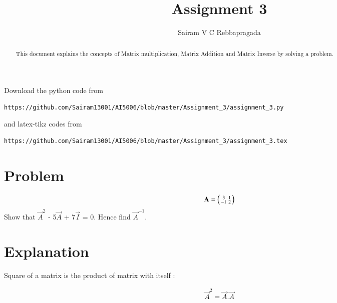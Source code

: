 \documentclass[journal,12pt,twocolumn]{IEEEtran}
\begin{document}
\renewcommand{\thefigure}{\theproblem}
\def\putbox#1#2#3{\makebox[0in][l]{\makebox[#1][l]{}\raisebox{\baselineskip}[0in][0in]{\raisebox{#2}[0in][0in]{#3}}}}
     \def\rightbox#1{\makebox[0in][r]{#1}}
     \def\centbox#1{\makebox[0in]{#1}}
     \def\topbox#1{\raisebox{-\baselineskip}[0in][0in]{#1}}
     \def\midbox#1{\raisebox{-0.5\baselineskip}[0in][0in]{#1}}
\vspace{3cm}
\title{Assignment 3}
\author{Sairam V C Rebbapragada}
\maketitle
\newpage
\bigskip
\renewcommand{\thefigure}{\theenumi}
\renewcommand{\thetable}{\theenumi}
\begin{abstract}
This document explains the concepts of Matrix multiplication, Matrix Addition and Matrix Inverse by solving a problem.
\end{abstract}
Download the python code from 
%
\begin{lstlisting}
https://github.com/Sairam13001/AI5006/blob/master/Assignment_3/assignment_3.py
\end{lstlisting}
%
and latex-tikz codes from 
%
\begin{lstlisting}
https://github.com/Sairam13001/AI5006/blob/master/Assignment_3/assignment_3.tex
\end{lstlisting}
%
\section{Problem}
\begin{align*}
   \mathbf{A}  = \begin{psmallmatrix} 3 & 1\\ -1 & 2\end{psmallmatrix}     
\end{align*}
Show that $\vec{A}^2$ - 5$\vec{A}$ + 7$\vec{I}$ = 0. Hence find $\Vec{A}^{-1}$.


\section{Explanation}

Square of a matrix is the product of matrix with itself :

\begin{align}
\Vec{A}^2 = \vec{A}.\Vec{A}
\end{align}
\end{document}

